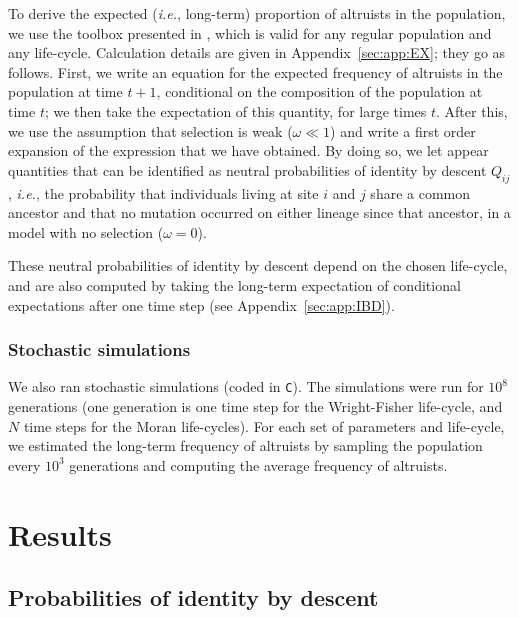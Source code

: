 \documentclass[11pt, letterpaper]{article}
\renewcommand{\eqref}[1]{\textup{{\normalfont eq.~(\ref{#1}}\normalfont)}}
\newcommand{\ie}{\textit{i.e.}}
\newcommand{\appname}[0]{Appendix}
\begin{document}
To derive the expected (\ie, long-term) proportion of altruists in the population, we use the toolbox presented in \citet{Debarre2017}, which is valid for any regular population and any life-cycle. Calculation details are given in \appname~\ref{sec:app:EX}; they go as follows. First, we write an equation for the expected frequency of altruists in the population at time $t+1$, conditional on the composition of the population at time $t$; we then take the expectation of this quantity, for large times $t$. After this, we use the assumption that selection is weak ($\omega \ll 1$) and write a first order expansion of the expression that we have obtained. By doing so, we let appear quantities that can be identified as neutral probabilities of identity by descent $Q_{ij}$, \ie, the probability that individuals living at site $i$  and $j$ share a common ancestor and that no mutation occurred on either lineage since that ancestor, in a model with no selection ($\omega=0$). 

These neutral probabilities of identity by descent depend on the chosen life-cycle, and are also computed by taking the long-term expectation of conditional expectations after one time step (see \appname~\ref{sec:app:IBD}). 


\subsubsection{Stochastic simulations}
We also ran stochastic simulations (coded in \texttt{C}). The simulations were run for $10^8$ generations (one generation is one time step for the Wright-Fisher life-cycle, and $N$ time steps for the Moran life-cycles). For each set of parameters and life-cycle, we estimated the long-term frequency of altruists by sampling the population every $10^3$ generations and computing the average frequency of altruists. 

\section{Results}

\subsection{Probabilities of identity by descent}

\end{document}
